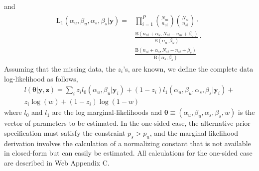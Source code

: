 \documentclass[useAMS,referee,usenatbib]{biom}
\begin{document}
and
\begin{align}
	\begin{split}
\mathrm{L}_1(\alpha_u,\beta_u,\alpha_s,\beta_s|\mathbf{y}) 
=&\prod_{i=1}^P\binom{N_{ui}}{n_{ui}} \binom{N_{si}}{n_{si}}\cdot\\ &\frac{\mathrm{B}(n_{ui}+\alpha_u,N_{ui}-n_{ui}+\beta_u)}{\mathrm{B}(\alpha_u,\beta_u)}\cdot \\ &\frac{\mathrm{B}(n_{si}+\alpha_s,N_{si}-n_{si}+\beta_s)}{\mathrm{B}(\alpha_s,\beta_s)}
\label{model2:unconstrained}
\end{split}
\end{align}
Assuming that the missing data, the $z_i$'s, are known, we define the complete data log-likelihood as follows,
\begin{equation}
\begin{split}
l(\boldsymbol{\theta}|\mathbf{y},\mathbf{z})=\sum_i z_i l_0(\alpha_u, \beta_u|\mathbf{y}_i) +(1-z_i) l_1(\alpha_u, \beta_u, \alpha_s, \beta_s|\mathbf{y}_i)+\\z_i\log(w)+(1-z_i)\log(1-w)\label{eq:cll}
\end{split}
\end{equation}
where $l_0$ and $l_1$ are the log marginal-likelihoods and $\boldsymbol{\theta}\equiv(\alpha_u, \beta_u, \alpha_s,\beta_s, w)$ is the vector of parameters to be estimated. In the one-sided case, the alternative prior specification must satisfy the constraint $p_s>p_u$, and the marginal likelihood derivation involves the calculation of a normalizing constant that is not available in closed-form but can easily be estimated. All calculations for the one-sided case are described in Web Appendix C. 
\end{document}
